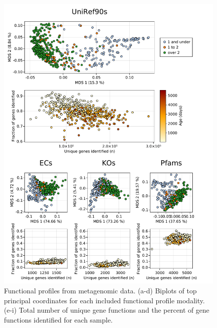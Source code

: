 \documentclass[fleqn,10pt]{wlscirep}
\begin{document}
\begin{figure}[ht]
    \centering
    \includegraphics[width=\linewidth]{../figures/04_other_functions}
    \caption{
        Functional profiles from metagenomic data.
        (a-d) Biplots of top principal coordinates for each included functional profile modality.
        (e-i) Total number of unique gene functions and the percent of gene functions identified for each sample. 
    }
    \label{fig:functional}
    \end{figure}
\end{document}
